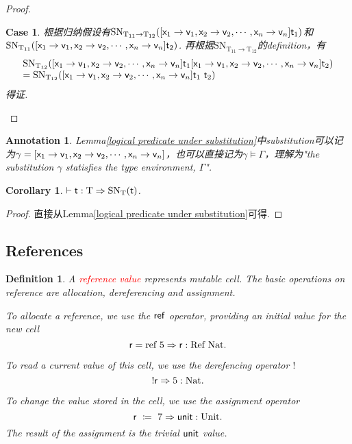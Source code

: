 \documentclass{article}
\theoremstyle{plain}
\newtheorem{corollary}[theorem]{Corollary}
\newtheorem{definition}[theorem]{Definition}
\newtheorem{annotation}[theorem]{Annotation}
\newtheorem{case}{Case}
\theoremstyle{nonumberplain}
\newtheorem{proof}{Proof}
\newcommand{\assign}[2]{\ensuremath{#1~\coloneqq~#2}}
\newcommand{\singletype}[1]{\text{#1}}
\newcommand{\termtype}[2]{\ensuremath{#1:#2}}
\newcommand{\term}[1]{\ensuremath\mathsf{#1}}
\newcommand{\redt}[1]{\textcolor{red}{#1}}
\begin{document}
\begin{proof}
\begin{case}
根据归纳假设有$\text{SN}_{\singletype{T}_{11} \to \singletype{T}_{12}}([\term{x}_1 \to \term{v}_1,\term{x}_2 \to \term{v}_2,\cdots,\term{x}_n \to \term{v}_n]\term{t}_1)$和$\text{SN}_{\singletype{T}_{11}}([\term{x}_1 \to \term{v}_1,\term{x}_2 \to \term{v}_2,\cdots,\term{x}_n \to \term{v}_n]\term{t}_2)$. 再根据$\text{SN}_{\singletype{T}_{11} \to \singletype{T}_{12}}$的definition，有
$$
\begin{array}{ll}
\text{SN}_{\singletype{T}_{12}}([\term{x}_1 \to \term{v}_1,\term{x}_2 \to \term{v}_2,\cdots,\term{x}_n \to \term{v}_n]\term{t}_1 [\term{x}_1 \to \term{v}_1,\term{x}_2 \to \term{v}_2,\cdots,\term{x}_n \to \term{v}_n]\term{t}_2) \\
= \text{SN}_{\singletype{T}_{12}}([\term{x}_1 \to \term{v}_1,\term{x}_2 \to \term{v}_2,\cdots,\term{x}_n \to \term{v}_n]\term{t}_1~\term{t}_2) 
\end{array}
$$
得证.
\end{case}
\end{proof}

\begin{annotation}
\rm Lemma\ref{logical predicate under substitution}中substitution可以记为$\gamma = [\term{x}_1 \to \term{v}_1,\term{x}_2 \to \term{v}_2,\cdots,\term{x}_n \to \term{v}_n]$，也可以直接记为$\gamma \models \Gamma$，理解为"the substitution $\gamma$ statisfies the type environment, $\Gamma$". 
\end{annotation}

\begin{corollary}
\rm $\vdash \termtype{\term{t}}{\singletype{T}} \Rightarrow \text{SN}_\singletype{T}(\term{t})$.
\end{corollary}

\begin{proof}
\rm 直接从Lemma\ref{logical predicate under substitution}可得.
\end{proof}

\newpage
\subsection{References}

\begin{definition}
\rm  A \redt{reference value} represents mutable cell. The basic operations on reference are allocation, dereferencing and assignment. 

To allocate a reference, we use the $\term{ref}$ operator, providing an initial value for the new cell
$$
\term{r} = \text{ref}~5 \Rightarrow \termtype{\term{r}}{\singletype{Ref}~\singletype{Nat}}. 
$$

To read a current value of this cell, we use the derefencing operator $!$
$$
!\term{r} \Rightarrow \termtype{5}{\singletype{Nat}}. 
$$ 


To change the value stored in the cell, we use the assignment operator
$$
\assign{\term{r}}{7} \Rightarrow \termtype{\term{unit}}{\singletype{Unit}}. 
$$
The result of the assignment is the trivial $\term{unit}$ value. 
\end{definition}
\end{document}
